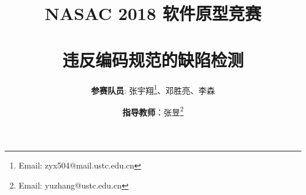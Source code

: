 \documentclass[a4paper]{ctexrep}
\begin{document}
\title{
NASAC 2018 软件原型竞赛 \\
~~\\
\bf 违反编码规范的缺陷检测
}

\author{{\bf 参赛队员}: 张宇翔\thanks{Email: zyx504@mail.ustc.edu.cn}、邓胜亮、李森\\}
\author{{\bf 指导教师}：张昱\thanks{Email: yuzhang@ustc.edu.cn}}

\maketitle
\tableofcontents
\newpage

\renewcommand\thesection{\arabic{section}}



\end{document}
